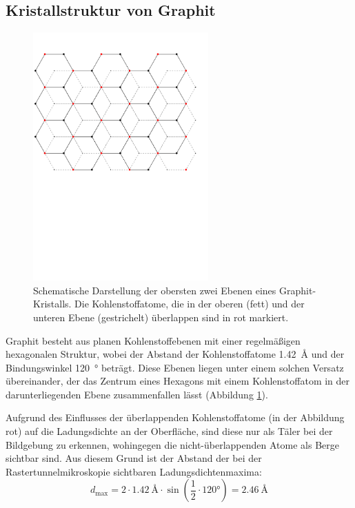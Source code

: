 \documentclass[10pt, a4paper]{article}
\begin{document}
\subsection{Kristallstruktur von Graphit}
\label{ssec:graphit}
\begin{figure}[h]
  \centering
  \includegraphics[width=0.6\textwidth]{grafiken/graphit.pdf}
  \caption{Schematische Darstellung der obersten zwei Ebenen eines Graphit-Kristalls. Die Kohlenstoffatome, die in der oberen (fett) und der unteren Ebene (gestrichelt) überlappen sind in rot markiert.}
  \label{fig:graphit}
\end{figure}
Graphit besteht aus planen Kohlenstoffebenen mit einer regelmäßigen hexagonalen Struktur, wobei der Abstand der Kohlenstoffatome \SI{1,42}{\angstrom} \cite{colton} und der Bindungswinkel \SI{120}{\degree} beträgt.
Diese Ebenen liegen unter einem solchen Versatz übereinander, der das Zentrum eines Hexagons mit einem Kohlenstoffatom in der darunterliegenden Ebene zusammenfallen lässt (Abbildung \ref{fig:graphit}).

Aufgrund des Einflusses der überlappenden Kohlenstoffatome (in der Abbildung rot) auf die Ladungsdichte an der Oberfläche, sind diese nur als Täler bei der Bildgebung zu erkennen, wohingegen die nicht-überlappenden Atome als Berge sichtbar sind.
Aus diesem Grund ist der Abstand der bei der Rastertunnelmikroskopie sichtbaren Ladungsdichtenmaxima:
\begin{equation*}
d_\mathrm{max} = 2 \cdot \SI{1,42}{\angstrom} \cdot \sin\left( \frac{1}{2} \cdot 120\si{\degree} \right) = \SI{2,46}{\angstrom}
\end{equation*}
\end{document}

